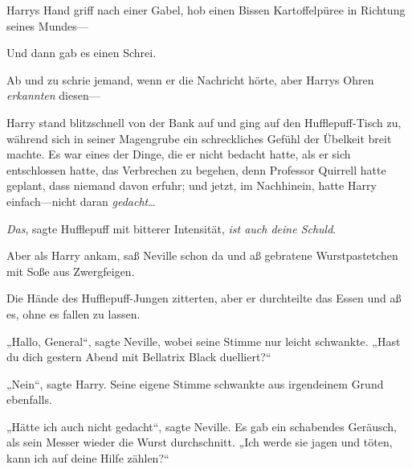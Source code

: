Harrys Hand griff nach einer Gabel, hob einen Bissen Kartoffelpüree in Richtung seines Mundes—

Und dann gab es einen Schrei.

Ab und zu schrie jemand, wenn er die Nachricht hörte, aber Harrys Ohren \emph{erkannten} diesen—

Harry stand blitzschnell von der Bank auf und ging auf den Hufflepuff-Tisch zu, während sich in seiner Magengrube ein schreckliches Gefühl der Übelkeit breit machte. Es war eines der Dinge, die er nicht bedacht hatte, als er sich entschlossen hatte, das Verbrechen zu begehen, denn Professor Quirrell hatte geplant, dass niemand davon erfuhr; und jetzt, im Nachhinein, hatte Harry einfach—nicht daran \emph{gedacht}…

\emph{Das}, sagte Hufflepuff mit bitterer Intensität, \emph{ist auch deine Schuld}.

Aber als Harry ankam, saß Neville schon da und aß gebratene Wurstpastetchen mit Soße aus Zwergfeigen.

Die Hände des Hufflepuff-Jungen zitterten, aber er durchteilte das Essen und aß es, ohne es fallen zu lassen.

„Hallo, General“, sagte Neville, wobei seine Stimme nur leicht schwankte. „Hast du dich gestern Abend mit Bellatrix Black duelliert?“

„Nein“, sagte Harry. Seine eigene Stimme schwankte aus irgendeinem Grund ebenfalls.

„Hätte ich auch nicht gedacht“, sagte Neville. Es gab ein schabendes Geräusch, als sein Messer wieder die Wurst durchschnitt. „Ich werde sie jagen und töten, kann ich auf deine Hilfe zählen?“

